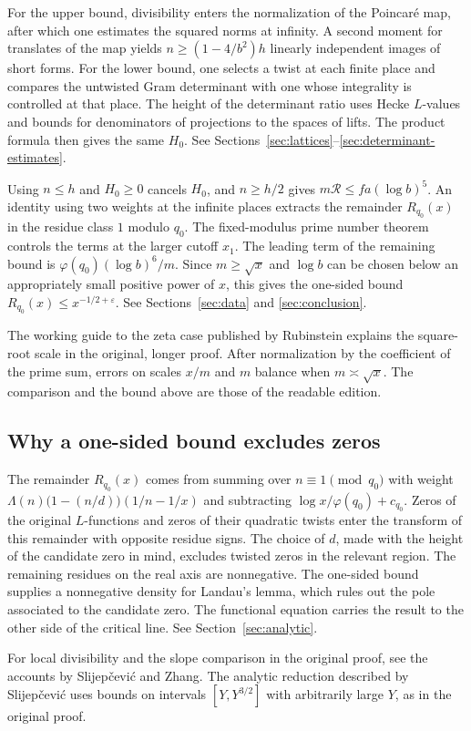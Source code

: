 For the upper bound, divisibility enters the normalization of the
Poincaré map, after which one estimates the squared norms at infinity.
A second moment for translates of the map yields
\(n\ge(1-4/b^2)h\) linearly independent images of short forms.
For the lower bound, one selects a twist at each finite place and
compares the untwisted Gram determinant with one whose integrality
is controlled at that place. The height of the determinant ratio uses
Hecke \(L\)-values and bounds for denominators of projections to the
spaces of lifts. The product formula then gives the same \(H_0\).
See Sections~\ref{sec:lattices}--\ref{sec:determinant-estimates}.

Using \(n\le h\) and \(H_0\ge0\) cancels \(H_0\), and \(n\ge h/2\)
gives \(m\mathcal R\le fa(\log b)^5\). An identity using two weights
at the infinite places extracts the remainder \(R_{q_0}(x)\) in
the residue class \(1\) modulo \(q_0\). The fixed-modulus prime number
theorem controls the terms at the larger cutoff \(x_1\). The leading
term of the remaining bound is \(\varphi(q_0)(\log b)^6/m\).
Since \(m\ge\sqrt{x}\) and \(\log b\) can be chosen below an
appropriately small positive power of \(x\), this gives the one-sided
bound \(R_{q_0}(x)\le x^{-1/2+\varepsilon}\).
See Sections~\ref{sec:data} and \ref{sec:conclusion}.

\begin{editorialnote}
The working guide to the zeta case published by Rubinstein explains
the square-root scale in the original, longer proof. After
normalization by the coefficient of the prime sum, errors on scales
\(x/m\) and \(m\) balance when \(m\asymp\sqrt{x}\). The comparison and
the bound above are those of the readable edition.
\cite[Section~I.8]{rubinstein}
\end{editorialnote}

\subsection*{Why a one-sided bound excludes zeros}

The remainder \(R_{q_0}(x)\) comes from summing over
\(n\equiv1\pmod{q_0}\) with weight
\(\Lambda(n)\bigl(1-(n/d)\bigr)(1/n-1/x)\) and subtracting
\(\log x/\varphi(q_0)+c_{q_0}\). Zeros of the original
\(L\)-functions and zeros of their quadratic twists enter the
transform of this remainder with opposite residue signs.
The choice of \(d\), made with the height of the candidate zero
in mind, excludes twisted zeros in the relevant region. The
remaining residues on the real axis are nonnegative. The
one-sided bound supplies a nonnegative density for Landau's lemma,
which rules out the pole associated to the candidate zero.
The functional equation carries the result to the other side
of the critical line. See Section~\ref{sec:analytic}.

For local divisibility and the slope comparison in the original proof,
see the accounts by Slijepčević and Zhang. The analytic reduction described
by Slijepčević uses bounds on intervals \([Y,Y^{3/2}]\) with arbitrarily
large \(Y\), as in the original proof.
\cite[Section~1.3]{slijepcevic} \cite[Sections~1 and~4]{zhang}
